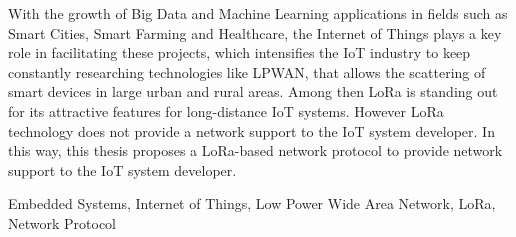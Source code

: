\abstract
With the growth of Big Data and Machine Learning applications in fields such as
Smart Cities, Smart Farming and Healthcare, the Internet of Things plays a key
role in facilitating these projects, which intensifies the IoT industry to keep
constantly researching technologies like LPWAN, that allows the scattering of
smart devices in large urban and rural areas. Among then LoRa is standing out
for its attractive features for long-distance IoT systems. However LoRa technology
does not provide a network support to the IoT system developer. In this way, this
thesis proposes a LoRa-based network protocol to provide network support to the
IoT system developer.
\begin{keywords}
Embedded Systems, Internet of Things, Low Power Wide Area Network, LoRa, Network Protocol
\end{keywords}